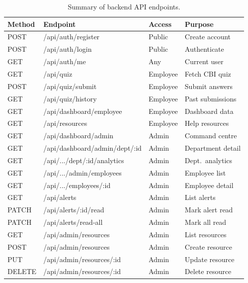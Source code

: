 \documentclass[12pt,a4paper]{article}
\begin{document}
\begin{table}[H]
  \centering
  \singlespacing
  \caption{Summary of backend API endpoints.}
  \label{tab:api-summary}
  \begin{tabular}{@{}llll@{}}
    \toprule
    \textbf{Method} & \textbf{Endpoint} & \textbf{Access} & \textbf{Purpose} \\
    \midrule
    POST   & /api/auth/register              & Public   & Create account \\
    POST   & /api/auth/login                 & Public   & Authenticate \\
    GET    & /api/auth/me                    & Any      & Current user \\
    GET    & /api/quiz                       & Employee & Fetch CBI quiz \\
    POST   & /api/quiz/submit                & Employee & Submit answers \\
    GET    & /api/quiz/history               & Employee & Past submissions \\
    GET    & /api/dashboard/employee         & Employee & Dashboard data \\
    GET    & /api/resources                  & Employee & Help resources \\
    GET    & /api/dashboard/admin            & Admin    & Command centre \\
    GET    & /api/dashboard/admin/dept/:id   & Admin    & Department detail \\
    GET    & /api/.../dept/:id/analytics     & Admin    & Dept.\ analytics \\
    GET    & /api/.../admin/employees        & Admin    & Employee list \\
    GET    & /api/.../employees/:id          & Admin    & Employee detail \\
    GET    & /api/alerts                     & Admin    & List alerts \\
    PATCH  & /api/alerts/:id/read            & Admin    & Mark alert read \\
    PATCH  & /api/alerts/read-all            & Admin    & Mark all read \\
    GET    & /api/admin/resources            & Admin    & List resources \\
    POST   & /api/admin/resources            & Admin    & Create resource \\
    PUT    & /api/admin/resources/:id        & Admin    & Update resource \\
    DELETE & /api/admin/resources/:id        & Admin    & Delete resource \\
    \bottomrule
  \end{tabular}
\end{table}
\end{document}
